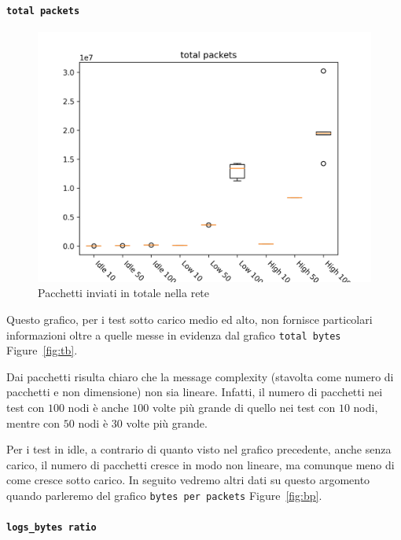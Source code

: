 \documentclass[target=bach]{thud}
\begin{document}
\paragraph{\lstinline{total packets}}

\begin{figure}[H]
    \centering
    \includegraphics[width=0.7\linewidth, keepaspectratio]{graphs/total packets.png}
    \caption{Pacchetti inviati in totale nella rete}
    \label{fig:tp}
\end{figure}

Questo grafico, per i test sotto carico medio ed alto, non fornisce particolari informazioni oltre a quelle messe in evidenza dal grafico \lstinline{total bytes} Figure~\ref{fig:tb}.

Dai pacchetti risulta chiaro che la message complexity (stavolta come numero di pacchetti e non dimensione) non sia lineare. Infatti, il numero di pacchetti nei test con $100$ nodi è anche $100$ volte più grande di quello nei test con $10$ nodi, mentre con $50$ nodi è $30$ volte più grande.

Per i test in idle, a contrario di quanto visto nel grafico precedente, anche senza carico, il numero di pacchetti cresce in modo non lineare, ma comunque meno di come cresce sotto carico. In seguito vedremo altri dati su questo argomento quando parleremo del grafico \lstinline{bytes per packets} Figure~\ref{fig:bp}.

\paragraph{\lstinline{logs_bytes ratio}}
\end{document}
